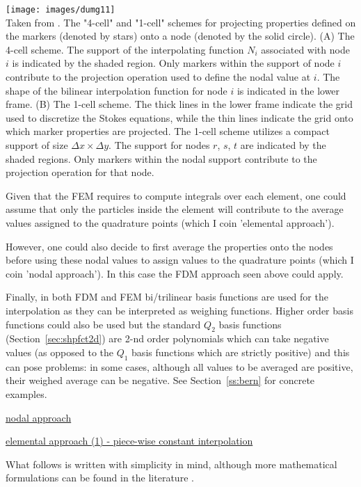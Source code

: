 \begin{center}
\texttt{[image: images/dumg11]}\\
{\captionfont Taken from \cite{dumg11}. The "4-cell" and "1-cell" schemes for projecting 
properties defined on the markers (denoted by stars) onto a node (denoted by the solid circle). 
(A) The 4-cell scheme. The support of the interpolating function $N_i$ associated
with node $i$ is indicated by the shaded region. Only markers within the support of node $i$ 
contribute to the projection operation used to define the nodal value at $i$. The shape of 
the bilinear interpolation function for node $i$ is indicated in the lower frame. 
(B) The 1-cell scheme. The thick lines in the lower frame indicate the grid used to discretize the
Stokes equations, while the thin lines indicate the grid onto which marker properties are projected. 
The 1-cell scheme utilizes a compact support of size $\Delta x \times  \Delta y$. The support 
for nodes $r$, $s$, $t$ are indicated by the shaded regions. Only markers within the nodal 
support contribute to the projection operation for that node.}
\end{center}

Given that the FEM requires to compute integrals over each element, one could assume that 
only the particles inside the element will contribute 
to the average values assigned to the quadrature points (which I coin 'elemental approach'). 

However, one could also decide to first average the properties onto the nodes
before using these nodal values to assign values to the quadrature points (which I coin 'nodal approach'). 
In this case the FDM approach seen above could apply. 

Finally, in both FDM and FEM bi/trilinear basis functions are used for the interpolation as 
they can be interpreted as weighing functions. Higher order basis functions could also be used 
but the standard $Q_2$ basis functions (Section~\ref{sec:shpfct2d})
are 2-nd order polynomials which can take negative values (as opposed to the $Q_1$ 
basis functions which are strictly positive)
and this can pose problems: in some cases, although all values to be averaged are positive, 
their weighed average can be negative.
See Section~\ref{ss:bern} for concrete examples.

\underline{nodal approach}

\underline{elemental approach (1) - piece-wise constant interpolation} 

What follows is written with simplicity in mind, although more mathematical formulations 
can be found in the literature \cite{galh18}.

